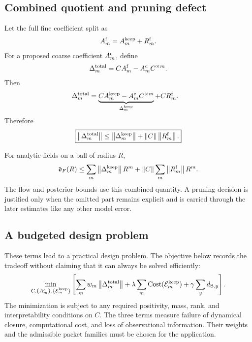 \subsection{Combined quotient and pruning defect}
Let the full fine coefficient split as
\[
  A_m^{\mathrm f}
  =A_m^{\mathrm{keep}}+R_m^{\mathrm f}.
\]
For a proposed coarse coefficient $A_m^{\mathrm c}$, define
\[
  \Delta_m^{\mathrm{total}}
  =CA_m^{\mathrm f}-A_m^{\mathrm c}C^{\times m}.
\]
Then
\begin{align}
  \Delta_m^{\mathrm{total}}
  &=
  \underbrace{CA_m^{\mathrm{keep}}-A_m^{\mathrm c}C^{\times m}}
  _{\Delta_m^{\mathrm{keep}}}
  +CR_m^{\mathrm f}.
  \label{PRIQ:eq:combined-pruning-quotient}
\end{align}
Therefore
\begin{equation}\label{PRIQ:eq:combined-pruning-bound}
  \boxed{
  \left\lVert \Delta_m^{\mathrm{total}}\right\rVert
  \leq
  \left\lVert \Delta_m^{\mathrm{keep}}\right\rVert
  +\left\lVert C\right\rVert\left\lVert R_m^{\mathrm f}\right\rVert.}
\end{equation}

For analytic fields on a ball of radius $R$,
\begin{equation}\label{PRIQ:eq:combined-field-majorant}
  \mathfrak d_F(R)
  \leq
  \sum_m
  \left\lVert \Delta_m^{\mathrm{keep}}\right\rVert R^m
  +
  \left\lVert C\right\rVert\sum_m\left\lVert R_m^{\mathrm f}\right\rVert R^m.
\end{equation}
The flow and posterior bounds use this combined quantity.  A pruning decision is justified only when the omitted part remains explicit and is carried through the later estimates like any other model error.

\subsection{A budgeted design problem}
These terms lead to a practical design problem.  The objective below records the tradeoff without claiming that it can always be solved efficiently:
\begin{equation}\label{PRIQ:eq:budgeted-design}
  \min_{C,\{A_m^{\mathrm c}\},\{\mathcal E_m^{\mathrm{keep}}\}}
  \left[
  \sum_mw_m\left\lVert \Delta_m^{\mathrm{total}}\right\rVert
  +\lambda\sum_m\operatorname{Cost}(\mathcal E_m^{\mathrm{keep}})
  +\gamma\sum_y d_{\mathsf B,y}
  \right].
\end{equation}
The minimization is subject to any required positivity, mass, rank, and interpretability conditions on $C$.  The three terms measure failure of dynamical closure, computational cost, and loss of observational information.  Their weights and the admissible packet families must be chosen for the application.


